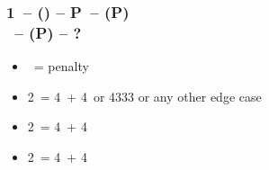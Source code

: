 \documentclass[12pt, a4paper]{article}
\begin{document}
\subsubsection*{1\ntx\ -- (\dbl) -- P\alrts\ -- (P)\\
                \rdbl\ -- (P) -- ?}
\begin{itemize}
    \item \pass\ = penalty
    \item 2\clubs\ = 4\clubs\ + 4\ or 4333 or any other edge case
    \item 2\diams\ = 4\diams\ + 4\major
    \item 2\hearts\ = 4\hearts\ + 4\spades
\end{itemize}

\end{document}
